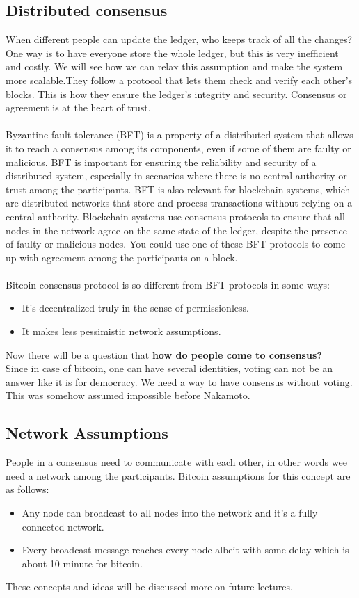 \documentclass{report}
\begin{document}
\subsection{Distributed consensus}
 When different people can update the ledger, who keeps track of all the changes? One way is to have everyone store the whole ledger, but this is very inefficient and costly. We will see how we can relax this assumption and make the system more scalable.They follow a protocol that lets them check and verify each other’s blocks. This is how they ensure the ledger’s integrity and security. Consensus or agreement is at the heart of trust.\\\\
Byzantine fault tolerance (BFT) is a property of a distributed system that allows it to reach a consensus among its components, even if some of them are faulty or malicious. BFT is important for ensuring the reliability and security of a distributed system, especially in scenarios where there is no central authority or trust among the participants. BFT is also relevant for blockchain systems, which are distributed networks that store and process transactions without relying on a central authority. Blockchain systems use consensus protocols to ensure that all nodes in the network agree on the same state of the ledger, despite the presence of faulty or malicious nodes.  You could use one of these BFT protocols to come up with agreement among the participants on a block.\\\\
Bitcoin consensus protocol is so different from BFT protocols in some ways:
\begin{itemize}
	\item It's decentralized truly in the sense of permissionless.
	\item It makes less pessimistic network assumptions.
\end{itemize}
Now there will be a question that  \textbf{how do people come to consensus?}\\
Since in case of bitcoin, one can have several identities,  voting can not be an answer like it is for democracy. We  need a way to have consensus without voting. This was somehow assumed impossible before Nakamoto.

\subsection{Network Assumptions}
People in a consensus need to communicate with each other, in other words wee need a network among the participants.
Bitcoin assumptions for this concept are as follows:
\begin{itemize}
	\item Any node can broadcast to all nodes into the network and it's a fully connected network.
	\item Every broadcast message reaches every node albeit with some delay which is about 10 minute for bitcoin. 
\end{itemize}
These concepts and ideas will be discussed more on future lectures.
\end{document}

